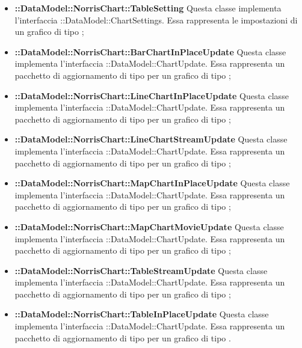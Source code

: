 \begin{itemize}
		\item \textbf{::DataModel::NorrisChart::TableSetting} Questa classe implementa l'interfaccia ::DataModel::ChartSettings. Essa rappresenta le impostazioni di un grafico di tipo ;

		\item \textbf{::DataModel::NorrisChart::BarChartInPlaceUpdate} Questa classe implementa l'interfaccia ::DataModel::ChartUpdate. Essa rappresenta un pacchetto di aggiornamento di tipo  per un grafico di tipo ;

		\item \textbf{::DataModel::NorrisChart::LineChartInPlaceUpdate} Questa classe implementa l'interfaccia ::DataModel::ChartUpdate. Essa rappresenta un pacchetto di aggiornamento di tipo  per un grafico di tipo ;

		\item \textbf{::DataModel::NorrisChart::LineChartStreamUpdate} Questa classe implementa l'interfaccia ::DataModel::ChartUpdate. Essa rappresenta un pacchetto di aggiornamento di tipo  per un grafico di tipo ;

		\item \textbf{::DataModel::NorrisChart::MapChartInPlaceUpdate} Questa classe implementa l'interfaccia ::DataModel::ChartUpdate. Essa rappresenta un pacchetto di aggiornamento di tipo  per un grafico di tipo ;

		\item \textbf{::DataModel::NorrisChart::MapChartMovieUpdate} Questa classe implementa l'interfaccia ::DataModel::ChartUpdate. Essa rappresenta un pacchetto di aggiornamento di tipo  per un grafico di tipo ;

		\item \textbf{::DataModel::NorrisChart::TableStreamUpdate} Questa classe implementa l'interfaccia ::DataModel::ChartUpdate. Essa rappresenta un pacchetto di aggiornamento di tipo  per un grafico di tipo ;

		\item \textbf{::DataModel::NorrisChart::TableInPlaceUpdate} Questa classe implementa l'interfaccia ::DataModel::ChartUpdate. Essa rappresenta un pacchetto di aggiornamento di tipo  per un grafico di tipo .
	\end{itemize}
